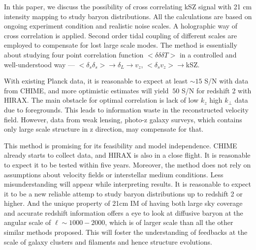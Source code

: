 In this paper, we discuss the possibility of cross correlating kSZ signal with 
21 cm intensity mapping to study baryon distributions. 
All the calculations are based on ongoing experiment condition and realistic noise scales. 
A holographic way of cross correlation is applied. 
Second order tidal coupling of different scales are employed to compensate for 
lost large scale modes. 
The method is essentially about studying four point correlation function 
$<\delta\delta\delta T>$ 
in a controlled and well-understood way --- 
$<\delta_s \delta_s> \rightarrow \delta_L \rightarrow v_z$, 
$<\delta_s v_z> \rightarrow $kSZ. 

With existing Planck data, 
it is reasonable to expect at least $\sim15$ S/N with data from CHIME, 
and more optimistic estimates will yield $~50$ S/N for redshift 2 with HIRAX. 
The main obstacle for optimal correlation 
is lack of low $k_z$ high $k_\perp$ data due to foregrounds. 
This leads to information waste in the reconstructed velocity field. 
However, data from weak lensing, photo-z galaxy surveys, which 
contains only large scale structure in z direction, may 
compensate for that. 
 
This method is promising for its feasibility and model independence. 
CHIME already starts to collect data, 
and HIRAX is also in a close flight. 
It is reasonable to expect it to be tested within five years. 
Moreover, the method does not rely on assumptions about velocity fields 
or interstellar medium conditions. 
Less misunderstanding will appear while interpreting results. 
It is reasonable to expect it to be a new 
reliable attemp to study baryon distributions up to 
redshift 2 or higher. 
And the unique property of 21cm IM of having both large sky coverage and 
accurate redshift information 
offers a eye to look at diffusive baryon 
at the angular scale of $\ell\sim 1000-2000$, 
which is of larger scale than all the other similar methods 
proposed. 
This will foster the understanding of feedbacks at the scale of 
galaxy clusters and filaments 
and hence structure evolutions.
